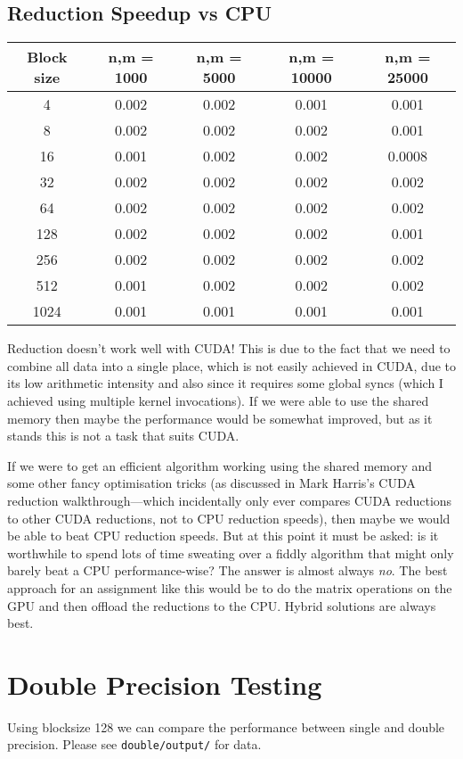\documentclass[a4paper, fleqn]{article}
\begin{document}
\subsection{Reduction Speedup vs CPU}%
\begin{center}
 \begin{tabular}{||c | c | c | c | c ||}
 \hline
 Block size & n,m = 1000 & n,m = 5000 & n,m = 10000 & n,m = 25000 \\ [0.5ex] 
 \hline
 4 & 0.002 & 0.002 & 0.001 & 0.001 \\
 \hline
 8 & 0.002 & 0.002 & 0.002 & 0.001 \\
 \hline
 16 & 0.001 & 0.002 & 0.002 & 0.0008 \\
 \hline
 32 & 0.002 & 0.002 & 0.002 & 0.002 \\
 \hline
 64 & 0.002 & 0.002 & 0.002 & 0.002 \\
 \hline
 128 & 0.002 & 0.002 & 0.002 & 0.001 \\
 \hline
 256 & 0.002 & 0.002 & 0.002 & 0.002 \\
 \hline
 512 & 0.001 & 0.002 & 0.002 & 0.002 \\
 \hline
 1024 & 0.001 & 0.001 & 0.001 & 0.001 \\
 \hline
\end{tabular}
\end{center}
Reduction doesn't work well with CUDA! This is due to the fact that we need to combine all data into a single place, which is not easily achieved in CUDA, due to its low arithmetic intensity and also since it requires some global syncs (which I achieved using multiple kernel invocations). If we were able to use the shared memory then maybe the performance would be somewhat improved, but as it stands this is not a task that suits CUDA. 

If we were to get an efficient algorithm working using the shared memory and some other fancy optimisation tricks (as discussed in Mark Harris's CUDA reduction walkthrough---which incidentally only ever compares CUDA reductions to other CUDA reductions, not to CPU reduction speeds), then maybe we would be able to beat CPU reduction speeds. But at this point it must be asked: is it worthwhile to spend lots of time sweating over a fiddly algorithm that might only barely beat a CPU performance-wise? The answer is almost always \emph{no}. The best approach for an assignment like this would be to do the matrix operations on the GPU and then offload the reductions to the CPU. Hybrid solutions are always best.

\section{Double Precision Testing}%

Using blocksize 128 we can compare the performance between single and double precision. Please see \texttt{double/output/} for data. 
\end{document}
